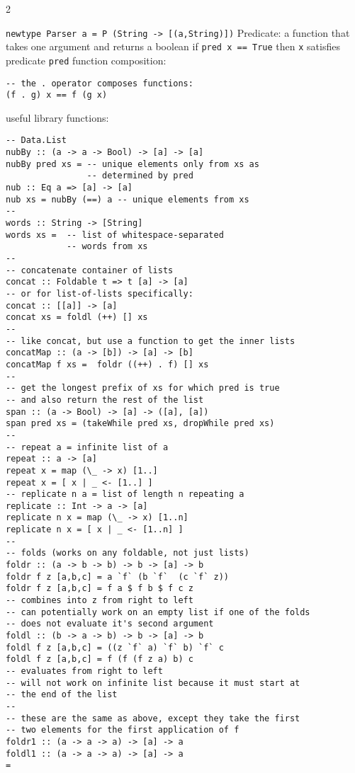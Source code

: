 \documentclass{article}
\def \columncount {2}
\begin{document}
\begin{multicols*}{\columncount}
\begin{outline}[longenum]

  \1 \texttt{newtype Parser a = P (String -> [(a,String)])}
  \1 Predicate: a function that takes one argument and returns a boolean
    \2 if \texttt{pred x == True} then \texttt{x} satisfies predicate \texttt{pred}
  \1 function composition:
\begin{verbatim}
-- the . operator composes functions:
(f . g) x == f (g x)
\end{verbatim}

\0 useful library functions:
\begin{verbatim}
-- Data.List
nubBy :: (a -> a -> Bool) -> [a] -> [a]
nubBy pred xs = -- unique elements only from xs as 
                -- determined by pred
nub :: Eq a => [a] -> [a]
nub xs = nubBy (==) a -- unique elements from xs
-- 
words :: String -> [String]
words xs =  -- list of whitespace-separated 
            -- words from xs
--
-- concatenate container of lists
concat :: Foldable t => t [a] -> [a]
-- or for list-of-lists specifically:
concat :: [[a]] -> [a]
concat xs = foldl (++) [] xs
--
-- like concat, but use a function to get the inner lists
concatMap :: (a -> [b]) -> [a] -> [b]
concatMap f xs =  foldr ((++) . f) [] xs
-- 
-- get the longest prefix of xs for which pred is true
-- and also return the rest of the list
span :: (a -> Bool) -> [a] -> ([a], [a])
span pred xs = (takeWhile pred xs, dropWhile pred xs)
-- 
-- repeat a = infinite list of a
repeat :: a -> [a]
repeat x = map (\_ -> x) [1..]
repeat x = [ x | _ <- [1..] ]
-- replicate n a = list of length n repeating a
replicate :: Int -> a -> [a]
replicate n x = map (\_ -> x) [1..n]
replicate n x = [ x | _ <- [1..n] ]
--
-- folds (works on any foldable, not just lists)
foldr :: (a -> b -> b) -> b -> [a] -> b
foldr f z [a,b,c] = a `f` (b `f`  (c `f` z))
foldr f z [a,b,c] = f a $ f b $ f c z
-- combines into z from right to left
-- can potentially work on an empty list if one of the folds
-- does not evaluate it's second argument
foldl :: (b -> a -> b) -> b -> [a] -> b
foldl f z [a,b,c] = ((z `f` a) `f` b) `f` c
foldl f z [a,b,c] = f (f (f z a) b) c
-- evaluates from right to left
-- will not work on infinite list because it must start at 
-- the end of the list
-- 
-- these are the same as above, except they take the first 
-- two elements for the first application of f
foldr1 :: (a -> a -> a) -> [a] -> a
foldl1 :: (a -> a -> a) -> [a] -> a                                                                                                                                                                                                                                                                                                                                                                       =
\end{verbatim}



\end{outline}
\end{multicols*}
\end{document}
